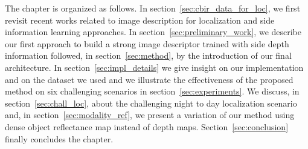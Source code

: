 The chapter is organized as follows. In section~\ref{sec:cbir_data_for_loc}, we first revisit recent works related to image description for localization and side information learning approaches. In section~\ref{sec:preliminary_work}, we describe our first approach to build a strong image descriptor trained with side depth information followed, in section~\ref{sec:method}, by the introduction of our final architecture. In section~\ref{sec:impl_details} we give insight on our implementation and on the dataset we used and we illustrate the effectiveness of the proposed method on six challenging scenarios in section~\ref{sec:experiments}. We discuss, in section~\ref{sec:chall_loc}, about the challenging night to day localization scenario and, in section~\ref{sec:modality_ref}, we present a variation of our method using dense object reflectance map instead of depth maps. Section~\ref{sec:conclusion} finally concludes the chapter.

